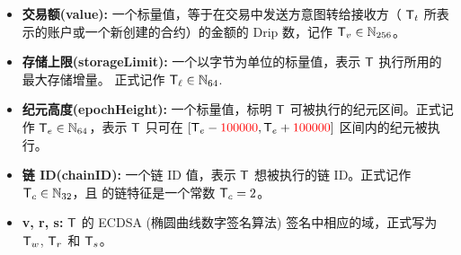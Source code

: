 \begin{itemize} [nosep]
	\item {\bf 交易额(value):} 一个标量值，等于在交易中发送方意图转给接收方（ $\textsf{T}_t$ 所表示的账户或一个新创建的合约）的金额的 Drip 数，记作  $\textsf{T}_v\in\mathbb{N}_{256}$。


	\item {\bf 存储上限(storageLimit):} 
	一个以字节为单位的标量值，表示 $\textsf{T}$ 执行所用的最大存储增量。
	正式记作 $\textsf{T}_{\ell}\in\mathbb{N}_{64}$.

	\item {\bf 纪元高度(epochHeight):} 
	一个标量值，标明 $\textsf{T}$ 可被执行的纪元区间。正式记作 $\textsf{T}_e\in\mathbb{N}_{64}$，表示 $\textsf{T}$ 只可在 $[\textsf{T}_e - {\color{red}100000}, \textsf{T}_e + {\color{red}100000}]$ 区间内的纪元被执行。

	\item {\bf 链 ID(chainID):} 
	一个链 ID 值，表示 $\textsf{T}$ 想被执行的链 ID。正式记作 $\textsf{T}_c\in\mathbb{N}_{32}$，且 {\name} 的链特征是一个常数 $\textsf{T}_c=2$。

	\item {\bf v, r, s:} 
	$\textsf{T}$ 的 ECDSA (椭圆曲线数字签名算法) 签名中相应的域，正式写为 $\textsf{T}_w$, $\textsf{T}_r$ 和 $\textsf{T}_s$。 
\end{itemize}

